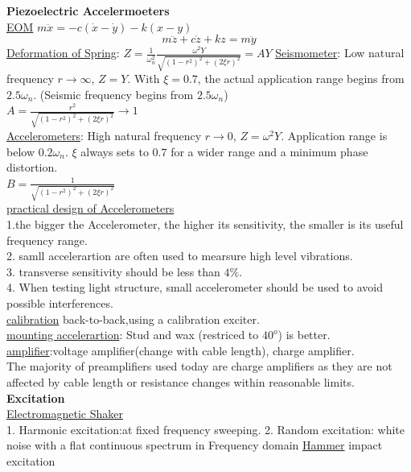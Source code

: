 \documentclass{article}
\begin{document}
\begin{multicols}{3}
\noindent\textbf{Piezoelectric Accelermoeters}\\
\underline{EOM} $m \ddot{x} = -c(\dot{x}-\dot{y}) - k(x-y)$
\begin{equation*}
  m\ddot{z}+c\dot{z}+kz=m\ddot{y}
\end{equation*}
  \underline{Deformation of Spring}: $Z = \frac{1}{\omega_n^2} \frac{\omega^2Y}{\sqrt{(1-r^2)^2+(2\xi r)^2}} = A Y$
  \underline{Seismometer}: Low natural frequency $r\rightarrow\infty$, $Z = Y$. With $\xi=0.7$, the actual application range begins from $2.5\omega_n$. (Seismic frequency begins from $2.5\omega_n$)\\
  $A=\frac{r^{2}}{\sqrt{(1-r^{2})^{2}+(2\xi r)^{2}}}\rightarrow 1$\\
  \underline{Accelerometers}: High natural frequency $r\rightarrow0$, $Z = \omega^2Y$. Application range is below $0.2\omega_n$. $\xi$ always sets to $0.7$ for a wider range and a minimum phase distortion.\\
  $B=\frac{1}{\sqrt{(1-r^{2})^{2}+(2\xi r)^{2}}}$\\
\underline{practical design of Accelerometers}\\
1.the bigger the Accelerometer, the higher its sensitivity, the smaller is its useful frequency range.\\
2. samll accelerartion are often used to mearsure high level vibrations.\\
3. transverse sensitivity should be less than $4\%$.\\
4. When testing light structure, small accelerometer should be used to avoid possible interferences.\\
\underline{calibration} back-to-back,using a calibration exciter.\\
\underline{mounting accelerartion}: Stud and wax (restriced to $40^{o}$) is better.\\
\underline{amplifier}:voltage amplifier(change with cable length), charge amplifier.\\
The majority of preamplifiers used today are charge amplifiers as they are not affected by cable length or resistance changes within reasonable limits.\\

\noindent\textbf{Excitation}\\
\underline{Electromagnetic Shaker}\\
  1. Harmonic excitation:at fixed frequency sweeping.
  2. Random excitation: white noise with  a flat continuous spectrum in Frequency domain
\underline{Hammer} impact excitation


\end{multicols}
\end{document}
